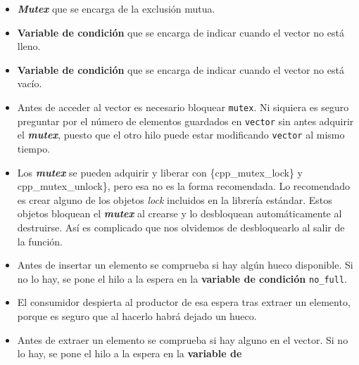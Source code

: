 \begin{Shaded}
\begin{Highlighting}[]
        \OperatorTok{=}\OperatorTok{();}    
\OperatorTok{();}

\OperatorTok{();}           

\OperatorTok{(}\OperatorTok{);}
    \OperatorTok{\}}                                   

\OperatorTok{\}}
\end{Highlighting}
\end{Shaded}

\begin{itemize}
\item
  \textbf{\emph{Mutex}} que se encarga de la exclusión mutua.
\item
  \textbf{Variable de condición} que se encarga de indicar cuando el
  vector no está lleno.
\item
  \textbf{Variable de condición} que se encarga de indicar cuando el
  vector no está vacío.
\item
  Antes de acceder al vector es necesario bloquear \texttt{mutex}. Ni
  siquiera es seguro preguntar por el número de elementos guardados en
  \texttt{vector} sin antes adquirir el \textbf{\emph{mutex}}, puesto
  que el otro hilo puede estar modificando \texttt{vector} al mismo
  tiempo.
\item
  Los \textbf{\emph{mutex}} se pueden adquirir y liberar con
  \{cpp\_mutex\_lock\} y cpp\_mutex\_unlock\}, pero esa no es la forma
  recomendada. Lo recomendado es crear alguno de los objetos \emph{lock}
  incluidos en la librería estándar. Estos objetos bloquean el
  \textbf{\emph{mutex}} al crearse y lo desbloquean automáticamente al
  destruirse. Así es complicado que nos olvidemos de desbloquearlo al
  salir de la función.
\item
  Antes de insertar un elemento se comprueba si hay algún hueco
  disponible. Si no lo hay, se pone el hilo a la espera en la
  \textbf{variable de condición} \texttt{no\_full}.
\item
  El consumidor despierta al productor de esa espera tras extraer un
  elemento, porque es seguro que al hacerlo habrá dejado un hueco.
\item
  Antes de extraer un elemento se comprueba si hay alguno en el vector.
  Si no lo hay, se pone el hilo a la espera en la \textbf{variable de
}
\end{itemize}
